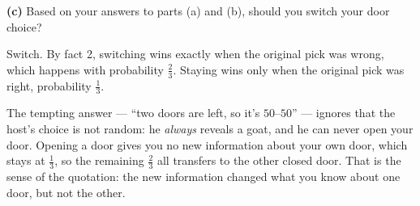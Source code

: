 \documentclass[12pt]{ximera}
\begin{document}
\begin{problem}
\begin{prompt}
\textbf{(c)} Based on your answers to parts (a) and (b), should you switch your door
choice?

\begin{multipleChoice}
\end{multipleChoice}

\begin{feedback}
Switch. By fact 2, switching wins exactly when the original pick was wrong, which
happens with probability $\frac23$. Staying wins only when the original pick was right,
probability $\frac13$.

The tempting answer --- ``two doors are left, so it's $50$--$50$'' --- ignores that the
host's choice is not random: he \emph{always} reveals a goat, and he can never open
your door. Opening a door gives you no new information about your own door, which
stays at $\frac13$, so the remaining $\frac23$ all transfers to the other closed door.
That is the sense of the quotation: the new information changed what you know about
one door, but not the other.
\end{feedback}
\end{prompt}
\end{problem}
\end{document}
